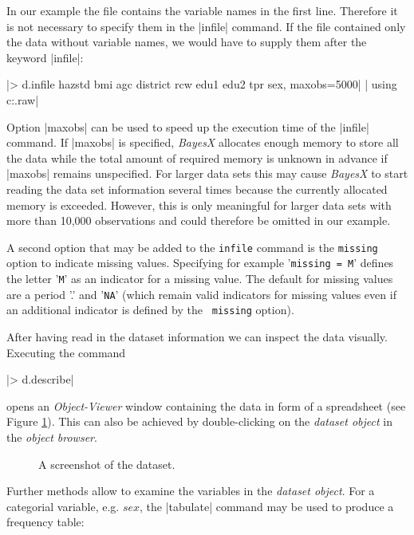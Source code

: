 \documentclass[a4paper]{article}
\begin{document}
In our example the file contains the variable names in the first
line. Therefore  it is not necessary to specify them in the
|infile| command. If the file contained only the data without
variable names, we would have to supply them after the keyword
|infile|:

 |> d.infile hazstd bmi agc district rcw edu1 edu2 tpr sex, maxobs=5000|
 |  using c:\data\zambia.raw|


Option |maxobs| can be used to speed up the execution time of the
|infile| command. If |maxobs| is specified, {\it BayesX} allocates
enough memory to store all the data while the total amount of
required memory is unknown in advance if |maxobs| remains
unspecified. For larger data sets this may cause {\it BayesX} to
start reading the data set information several times because the
currently allocated memory is exceeded. However, this is only
meaningful for larger data sets with more than 10,000 observations
and could therefore be omitted in our example.

A second option that may be added to the {\tt infile} command is the
{\tt missing} option to indicate missing values. Specifying for
example '{\tt missing = M}' defines the letter '{\tt M}' as an
indicator for a missing value. The default for missing values are a
period '.' and '{\tt NA}' (which remain valid indicators for missing
values even if an additional indicator is defined by the {\tt
missing} option).

After having read in the dataset information we can inspect the
data visually. Executing the command

|> d.describe|

opens an {\it Object-Viewer} window containing the data in form of
a spreadsheet (see Figure \ref{screenshot}). This can also be
achieved by double-clicking on the {\it dataset object} in the
{\it object browser}.

\vspace{1cm}

\begin{figure}[ht]
\begin{center}
 {\it\caption{A
screenshot of the dataset.\label{screenshot}}}
\end{center}
\end{figure}

Further methods allow to examine the variables in the {\it dataset
object}. For a categorial variable, e.g. $sex$, the |tabulate|
command may be used to produce a frequency table:
\end{document}
